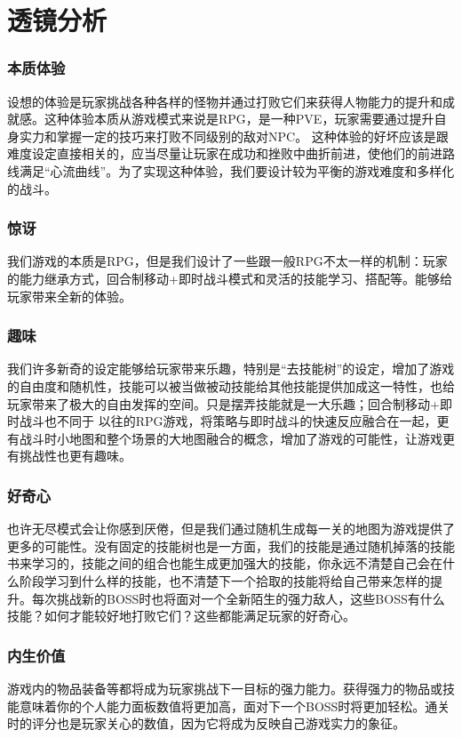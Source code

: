 ﻿\documentclass{article}
\begin{document}
\section{透镜分析}
\subsubsection{本质体验}
设想的体验是玩家挑战各种各样的怪物并通过打败它们来获得人物能力的提升和成就感。这种体验本质从游戏模式来说是RPG，是一种PVE，玩家需要通过提升自身实力和掌握一定的技巧来打败不同级别的敌对NPC。
这种体验的好坏应该是跟难度设定直接相关的，应当尽量让玩家在成功和挫败中曲折前进，使他们的前进路线满足“心流曲线”。为了实现这种体验，我们要设计较为平衡的游戏难度和多样化的战斗。
\subsubsection{惊讶}
我们游戏的本质是RPG，但是我们设计了一些跟一般RPG不太一样的机制：玩家的能力继承方式，回合制移动+即时战斗模式和灵活的技能学习、搭配等。能够给玩家带来全新的体验。
\subsubsection{趣味}
我们许多新奇的设定能够给玩家带来乐趣，特别是“去技能树”的设定，增加了游戏的自由度和随机性，技能可以被当做被动技能给其他技能提供加成这一特性，也给玩家带来了极大的自由发挥的空间。只是摆弄技能就是一大乐趣；回合制移动+即时战斗也不同于
以往的RPG游戏，将策略与即时战斗的快速反应融合在一起，更有战斗时小地图和整个场景的大地图融合的概念，增加了游戏的可能性，让游戏更有挑战性也更有趣味。
\subsubsection{好奇心}
也许无尽模式会让你感到厌倦，但是我们通过随机生成每一关的地图为游戏提供了更多的可能性。没有固定的技能树也是一方面，我们的技能是通过随机掉落的技能书来学习的，技能之间的组合也能生成更加强大的技能，你永远不清楚自己会在什么阶段学习到什么样的技能，也不清楚下一个拾取的技能将给自己带来怎样的提升。每次挑战新的BOSS时也将面对一个全新陌生的强力敌人，这些BOSS有什么技能？如何才能较好地打败它们？这些都能满足玩家的好奇心。
\subsubsection{内生价值}
游戏内的物品装备等都将成为玩家挑战下一目标的强力能力。获得强力的物品或技能意味着你的个人能力面板数值将更加高，面对下一个BOSS时将更加轻松。通关时的评分也是玩家关心的数值，因为它将成为反映自己游戏实力的象征。
\end{document}
